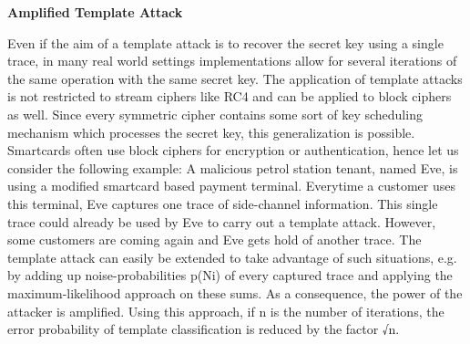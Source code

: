 \textbf{Amplified Template Attack}

    Even if the aim of a template attack is to recover the secret key using a single trace, in many real world settings implementations allow for several iterations of the same operation with the same secret key. The application of template attacks is not restricted to stream ciphers like RC4 and can be applied to block ciphers as well. Since every symmetric cipher contains some sort of key scheduling mechanism which processes the secret key, this generalization is possible. Smartcards often use block ciphers for encryption or authentication, hence let us consider the following example: A malicious petrol station tenant, named Eve, is using a modified smartcard based payment terminal. Everytime a customer uses this terminal, Eve captures one trace of side-channel information. This single trace could already be used by Eve to carry out a template attack.
    However, some customers are coming again and Eve gets hold of another
    trace. The template attack can easily be extended to take advantage of such
    situations, e.g. by adding up noise-probabilities p(Ni) of every captured trace and applying the maximum-likelihood approach on these sums. As a consequence, the power of the attacker is amplified. Using this approach, if n is the number of iterations, the error probability of template classification is reduced by the factor √n. 